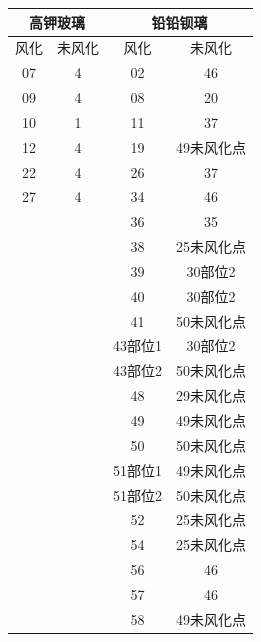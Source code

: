 \documentclass[withoutpreface,bwprint]{cumcmthesis} %
\begin{document}
\begin{appendices}
\begin{table}[H]
  \begin{tabular}{cccc}
    \toprule[1.5pt]
    \multicolumn{2}{c}{高钾玻璃} & \multicolumn{2}{c}{铅铅钡璃} \\ \hline
    风化         & 未风化         & 风化         & 未风化         \\
    07         & 4           & 02         & 46          \\
    09         & 4           & 08         & 20          \\
    10         & 1           & 11         & 37          \\
    12         & 4           & 19         & 49未风化点      \\
    22         & 4           & 26         & 37          \\
    27         & 4           & 34         & 46          \\
    &             & 36         & 35          \\
    &             & 38         & 25未风化点      \\
    &             & 39         & 30部位2       \\
    &             & 40         & 30部位2       \\
    &             & 41         & 50未风化点      \\
    &             & 43部位1      & 30部位2       \\
    &             & 43部位2      & 50未风化点      \\
    &             & 48         & 29未风化点      \\
    &             & 49         & 49未风化点      \\
    &             & 50         & 50未风化点      \\
    &             & 51部位1      & 49未风化点      \\
    &             & 51部位2      & 50未风化点      \\
    &             & 52         & 25未风化点      \\
    &             & 54         & 25未风化点      \\
    &             & 56         & 46          \\
    &             & 57         & 46          \\
    &             & 58         & 49未风化点      \\ \bottomrule[1.5pt]
  \end{tabular}
\end{table}


\end{appendices}
\end{document}
